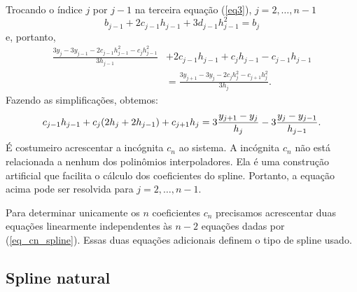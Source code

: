 \documentclass[main.tex]{subfiles}
\begin{document}
Trocando o índice $j$ por $j-1$ na terceira equação (\ref{eq3}), $j=2,\ldots, n-1$
\begin{equation}
b_{j-1}+2c_{j-1}h_{j-1}+3d_{j-1}h_{j-1}^2=b_{j}  
\end{equation}
e, portanto,
\begin{equation}
  \begin{split}
    \frac{3y_{j}-3y_{j-1}-2c_{j-1}h_{j-1}^2-c_{j}h_{j-1}^2}{3h_{j-1}} &+ 2c_{j-1}h_{j-1}+c_{j}h_{j-1}-c_{j-1}h_{j-1} \\
    &=\frac{3y_{j+1}-3y_j-2c_jh_j^2-c_{j+1}h_j^2}{3h_j}.      
  \end{split}
\end{equation}
Fazendo as simplificações, obtemos:
\begin{equation}{\label{eq_cn_spline}}
c_{j-1}h_{j-1}+c_j(2h_j+2h_{j-1})+c_{j+1}h_j=3\frac{y_{j+1}-y_j}{h_j}-3\frac{y_{j}-y_{j-1}}{h_{j-1}}.
\end{equation}
É costumeiro acrescentar a incógnita $c_n$ ao sistema. A incógnita $c_n$ não está relacionada a nenhum dos polinômios interpoladores. Ela é uma construção artificial que facilita o cálculo dos coeficientes do spline. Portanto, a equação acima pode ser resolvida para $j=2, \ldots, n-1$.

Para determinar unicamente os $n$ coeficientes $c_n$ precisamos acrescentar duas equações linearmente independentes às $n-2$ equações dadas por (\ref{eq_cn_spline}). Essas duas equações adicionais definem o tipo de spline usado.

\subsection{Spline natural}
\end{document}
